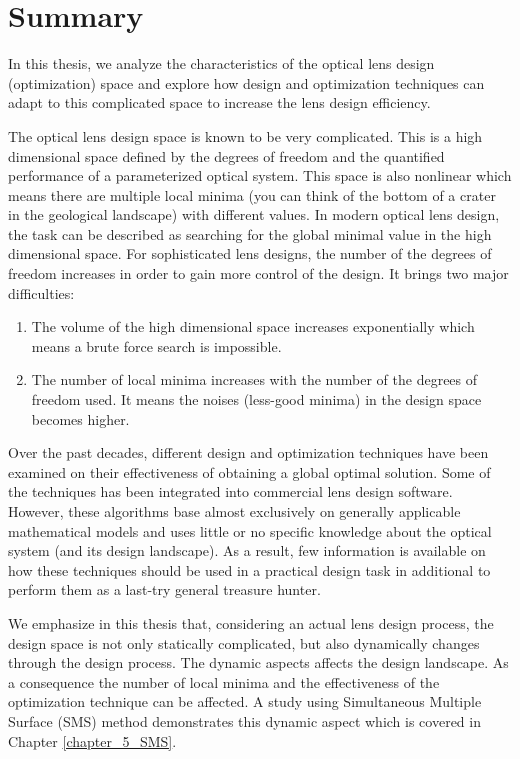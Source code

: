 \chapter*{Summary}

In this thesis, we analyze the characteristics of the optical lens design (optimization) space and explore how design and optimization techniques can adapt to this complicated space to increase the lens design efficiency. 

The optical lens design space is known to be very complicated. This is a high dimensional space defined by the degrees of freedom and the quantified performance of a parameterized optical system. This space is also nonlinear which means there are multiple local minima (you can think of the bottom of a crater in the geological landscape) with different values. In modern optical lens design, the task can be described as searching for the global minimal value in the high dimensional space. For sophisticated lens designs, the number of the degrees of freedom increases in order to gain more control of the design. It brings two major difficulties:  
\begin{enumerate}[nosep]
\item The volume of the high dimensional space increases exponentially which means a brute force search is impossible. 
\item The number of local minima increases with the number of the degrees of freedom used. It means the noises (less-good minima) in the design space becomes higher. 
\end{enumerate}

Over the past decades, different design and optimization techniques have been examined on their effectiveness of obtaining a global optimal solution. Some of the techniques has been integrated into commercial lens design software. However, these algorithms base almost exclusively on generally applicable mathematical models and uses little or no specific knowledge about the optical system (and its design landscape). As a result, few information is available on how these techniques should be used in a practical design task in additional to perform them as a last-try general treasure hunter. 

We emphasize in this thesis that, considering an actual lens design process, the design space is not only statically complicated, but also dynamically changes through the design process. The dynamic aspects affects the design landscape. As a consequence the number of local minima and the effectiveness of the optimization technique can be affected. A study using Simultaneous Multiple Surface (SMS) method demonstrates this dynamic aspect which is covered in Chapter \ref{chapter_5_SMS}.

